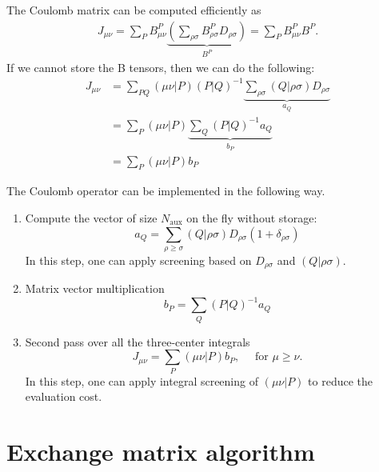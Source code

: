 \documentclass[aip,preprint]{revtex4-1}
\begin{document}
The Coulomb matrix can be computed efficiently as
\begin{equation}
\begin{split}
J_{\mu \nu} = \sum_{P} B^{P}_{\mu \nu}
\underbrace{\left( \sum_{\rho \sigma}B^{P}_{\rho \sigma} D_{\rho \sigma} \right)}_{B^P}=
\sum_{P} B^{P}_{\mu \nu} B^P.
\end{split}
\end{equation}
If we cannot store the B tensors, then we can do the following:
\begin{equation}
\begin{split}
J_{\mu \nu} & = \sum_{PQ} (\mu \nu | P) (P|Q)^{-1}
\underbrace{\sum_{\rho \sigma} (Q|\rho \sigma) D_{\rho \sigma}}_{a_Q} \\
 & = \sum_{P} (\mu \nu | P) \underbrace{\sum_{Q} (P|Q)^{-1} a_Q}_{b_P} \\
 & = \sum_{P} (\mu \nu | P) b_P
\end{split}
\end{equation}

The Coulomb operator can be implemented in the following way.
\begin{enumerate}
    \item Compute the vector of size $N_\mathrm{aux}$ on the fly without storage:
\begin{equation}
a_Q = \sum_{\rho \geq \sigma} (Q|\rho \sigma) D_{\rho \sigma} (1+\delta_{\rho \sigma})
\end{equation}
In this step, one can apply screening based on $D_{\rho \sigma}$ and $(Q|\rho \sigma)$. 

    \item Matrix vector multiplication
\begin{equation}
b_P = \sum_{Q} (P|Q)^{-1} a_Q
\end{equation}
    \item Second pass over all the three-center integrals
\begin{equation}
J_{\mu \nu} = \sum_{P} (\mu \nu | P) b_P, \quad \text{ for } \mu \geq \nu.
\end{equation}
In this step, one can apply integral screening of $(\mu \nu | P)$ to reduce the evaluation cost.
\end{enumerate}

\section{Exchange matrix algorithm}
\end{document}
